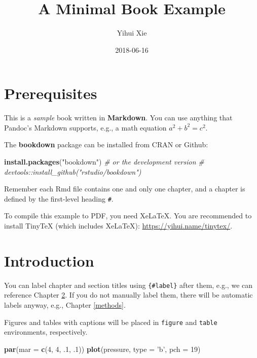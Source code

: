 \documentclass[]{book}
\title{A Minimal Book Example}
\author{Yihui Xie}
\date{2018-06-16}
\newenvironment{Shaded}{\begin{snugshade}}{\end{snugshade}}
\newcommand{\KeywordTok}[1]{\textcolor[rgb]{0.13,0.29,0.53}{\textbf{#1}}}
\newcommand{\DataTypeTok}[1]{\textcolor[rgb]{0.13,0.29,0.53}{#1}}
\newcommand{\DecValTok}[1]{\textcolor[rgb]{0.00,0.00,0.81}{#1}}
\newcommand{\StringTok}[1]{\textcolor[rgb]{0.31,0.60,0.02}{#1}}
\newcommand{\CommentTok}[1]{\textcolor[rgb]{0.56,0.35,0.01}{\textit{#1}}}
\newcommand{\NormalTok}[1]{#1}
\theoremstyle{definition}
\theoremstyle{definition}
\theoremstyle{definition}
\theoremstyle{remark}
\begin{document}
\maketitle

{
\setcounter{tocdepth}{1}
\tableofcontents
}
\chapter{Prerequisites}\label{prerequisites}

This is a \emph{sample} book written in \textbf{Markdown}. You can use
anything that Pandoc's Markdown supports, e.g., a math equation
\(a^2 + b^2 = c^2\).

The \textbf{bookdown} package can be installed from CRAN or Github:

\begin{Shaded}
\begin{Highlighting}[]
\KeywordTok{install.packages}\NormalTok{(}\StringTok{"bookdown"}\NormalTok{)}
\CommentTok{# or the development version}
\CommentTok{# devtools::install_github("rstudio/bookdown")}
\end{Highlighting}
\end{Shaded}

Remember each Rmd file contains one and only one chapter, and a chapter
is defined by the first-level heading \texttt{\#}.

To compile this example to PDF, you need XeLaTeX. You are recommended to
install TinyTeX (which includes XeLaTeX):
\url{https://yihui.name/tinytex/}.

\chapter{Introduction}\label{intro}

You can label chapter and section titles using \texttt{\{\#label\}}
after them, e.g., we can reference Chapter \ref{intro}. If you do not
manually label them, there will be automatic labels anyway, e.g.,
Chapter \ref{methods}.

Figures and tables with captions will be placed in \texttt{figure} and
\texttt{table} environments, respectively.

\begin{Shaded}
\begin{Highlighting}[]
\KeywordTok{par}\NormalTok{(}\DataTypeTok{mar =} \KeywordTok{c}\NormalTok{(}\DecValTok{4}\NormalTok{, }\DecValTok{4}\NormalTok{, .}\DecValTok{1}\NormalTok{, .}\DecValTok{1}\NormalTok{))}
\KeywordTok{plot}\NormalTok{(pressure, }\DataTypeTok{type =} \StringTok{'b'}\NormalTok{, }\DataTypeTok{pch =} \DecValTok{19}\NormalTok{)}
\end{Highlighting}
\end{Shaded}
\end{document}
